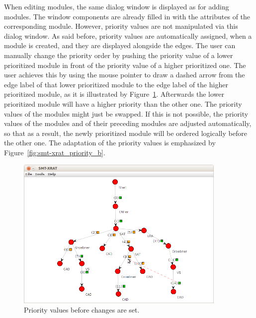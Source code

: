 When editing modules, the same dialog window is displayed as for adding modules.
The window components are already filled in with the attributes of the corresponding
module. However, priority values are not manipulated via this dialog window. As said before,
priority values are automatically assigned, when a module is created, and they are 
displayed alongside the edges. The user can manually change the priority order by 
pushing the priority value of a lower prioritized module in front of the priority
value of a higher prioritized one. The user achieves this by using the mouse pointer
to draw a dashed arrow from the edge label of that lower prioritized module to the
edge label of the higher prioritized module, as it is illustrated by Figure~\ref{fig:smt-xrat_priority_a}. Afterwards the lower prioritized module will have a higher
priority than the other one. The priority values of the modules might just be swapped.
If this is not possible, the priority values of the modules and of their preceding modules
are adjusted automatically, so that as a result, the newly prioritized module will be
ordered logically before the other one. The adaptation of the priority values is
emphasized by Figure~\ref{fig:smt-xrat_priority_b}.
\begin{figure}[ht]
  \begin{center}
    \includegraphics[width=0.9\textwidth]{graphics/smt-xrat_priority_a.png}
  \end{center}
  \caption{Priority values before changes are set.}
  \label{fig:smt-xrat_priority_a}
\end{figure}

